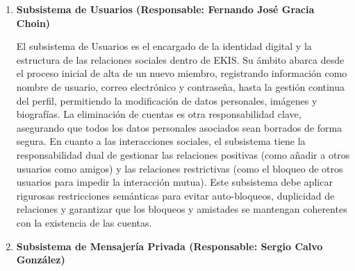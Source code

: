 \documentclass[twoside,openright,titlepage,numbers=noenddot,headinclude,footinclude=true,
cleardoublepage=empty,abstractoff,BCOR=5mm,paper=a4,fontsize=12pt,main=spanish,pdfstartpage=1]{scrreprt}
\theoremstyle{plain}
\begin{document}
\begin{itemize}
\begin{enumerate}
      Este subsistema opera como el centro de gestión de anuncios de EKIS, centrándose en la administración eficiente de los anuncios que se presentan a los usuarios. Las responsabilidades son ejecutadas principalmente por el administrador e incluyen el control del ciclo de vida de los anuncios. Esto implica la creación de nuevos anuncios, donde se definen parámetros cruciales como el identificador único, el contenido (título y cuerpo), el enlace de destino y el periodo de vigencia específico (Fechas de Inicio y Fin). Una de las funciones más importantes es la segmentación, que permite al administrador definir el público objetivo al asignar características específicas a cada anuncio. El subsistema también debe manejar la modificación de los detalles de un anuncio ya existente y la eliminación del mismo, con la restricción de que los anuncios activos (dentro de su periodo de vigencia) no pueden ser borrados. Finalmente, tiene la responsabilidad de proporcionar la información completa de un anuncio al sistema cuando sea necesario para su visualización o procesamiento.\\

      \item \textbf{Subsistema de Usuarios (Responsable: Fernando José Gracia Choin)}

      El subsistema de Usuarios es el encargado de la identidad digital y la estructura de las relaciones sociales dentro de EKIS. Su ámbito abarca desde el proceso inicial de alta de un nuevo miembro, registrando información como nombre de usuario, correo electrónico y contraseña, hasta la gestión continua del perfil, permitiendo la modificación de datos personales, imágenes y biografías. La eliminación de cuentas es otra responsabilidad clave, asegurando que todos los datos personales asociados sean borrados de forma segura. En cuanto a las interacciones sociales, el subsistema tiene la responsabilidad dual de gestionar las relaciones positivas (como añadir a otros usuarios como amigos) y las relaciones restrictivas (como el bloqueo de otros usuarios para impedir la interacción mutua). Este subsistema debe aplicar rigurosas restricciones semánticas para evitar auto-bloqueos, duplicidad de relaciones y garantizar que los bloqueos y amistades se mantengan coherentes con la existencia de las cuentas.\\

      \item \textbf{Subsistema de Mensajería Privada (Responsable: Sergio Calvo González)}


\end{enumerate}
\end{itemize}
\end{document}
